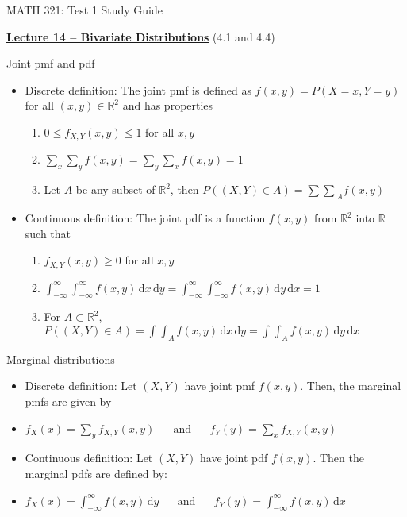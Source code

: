 \documentclass{article}
\newcommand{\bu}[1]{\textbf{\ul{#1}}}				%
\newcommand{\integral}[4]{\displaystyle \int_{#1}^{#2} #3 \,\mathrm{d} #4}		%
\begin{document}
\begin{center}
{\Huge MATH 321: Test 1 Study Guide}

\end{center}

\bigskip\bigskip

{\large \bu{Lecture 14 -- Bivariate Distributions}} (4.1 and 4.4)\bigskip

Joint pmf and pdf
\begin{itemize}
    \item Discrete definition: The joint pmf is defined as $f(x,y) = P(X = x, Y = y)$ for all $(x, y) \in \mathbb{R}^2$ and has properties
    \begin{enumerate}
        \item $0 \le f_{X,Y}(x,y) \le 1$ \quad for all $x, y$
        \item $\displaystyle \sum_x \sum_y f(x,y) = \sum_y \sum_x f(x,y) = 1$
        \item Let $A$ be any subset of $\mathbb{R}^2$, then $\displaystyle P((X,Y) \in A) = {\sum \sum}_A f(x,y)$
    \end{enumerate}
    \item Continuous definition: The joint pdf is a function $f(x,y)$ from $\mathbb{R}^2$ into $\mathbb{R}$ such that
    \begin{enumerate}
        \item $f_{X,Y}(x,y) \ge 0$ \quad for all $x, y$
        \item $\integral{-\infty}{\infty}{\integral{-\infty}{\infty}{f(x,y)}{x}}{y} = \integral{-\infty}{\infty}{\integral{-\infty}{\infty}{f(x,y)}{y}}{x} = 1$
        \item For $A \subset \mathbb{R}^2$, $\displaystyle P((X,Y) \in A) = \integral{}{}{\integral{A}{}{f(x,y)}{x}}{y} = \integral{}{}{\integral{A}{}{f(x,y)}{y}}{x}$
    \end{enumerate}
\end{itemize}\bigskip

Marginal distributions
\begin{itemize}
    \item Discrete definition: Let $(X,Y)$ have joint pmf $f(x,y)$. Then, the marginal pmfs are given by
    \item[] $\displaystyle f_X(x) = \sum_y f_{X,Y}(x,y) \hspace{20pt} \text{and} \hspace{20pt} f_Y(y) = \sum_x f_{X,Y}(x,y)$
    \item Continuous definition: Let $(X,Y)$ have joint pdf $f(x,y)$. Then the marginal pdfs are defined by:
    \item[] $f_X(x) = \integral{-\infty}{\infty}{f(x,y)}{y} \hspace{20pt} \text{and} \hspace{20pt} f_Y(y) = \integral{-\infty}{\infty}{f(x,y)}{x}$
\end{itemize}\bigskip
\end{document}
